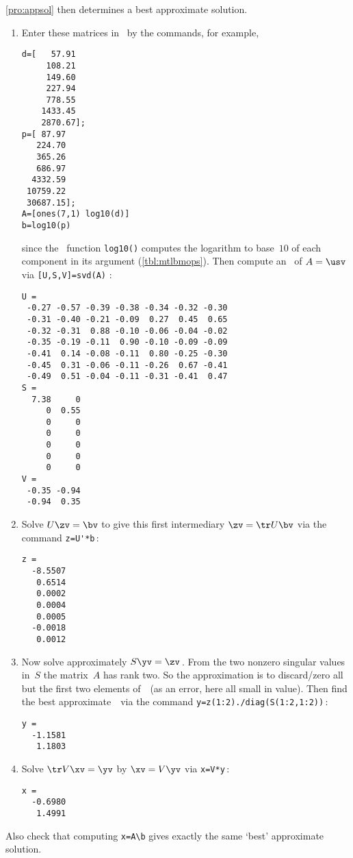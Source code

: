 \begin{example}
\begin{solution}
\autoref{pro:appsol} then determines a best approximate solution.
\begin{enumerate}
\item Enter these matrices in \script\ by the commands, for example,
\setbox\ajrqrbox\hbox{}%
\marginajrbox%
\begin{verbatim}
d=[   57.91
     108.21
     149.60
     227.94
     778.55
    1433.45
    2870.67];
p=[ 87.97
   224.70
   365.26
   686.97
  4332.59
 10759.22
 30687.15];
A=[ones(7,1) log10(d)]
b=log10(p)
\end{verbatim}
since the \script\ function \verb|log10()| computes the logarithm to base~\(10\) of each component in its argument (\autoref{tbl:mtlbmops}).
Then compute an \svd\ of \(A=\usv\) via \verb|[U,S,V]=svd(A)| \twodp:
\begin{verbatim}
U =
 -0.27 -0.57 -0.39 -0.38 -0.34 -0.32 -0.30
 -0.31 -0.40 -0.21 -0.09  0.27  0.45  0.65
 -0.32 -0.31  0.88 -0.10 -0.06 -0.04 -0.02
 -0.35 -0.19 -0.11  0.90 -0.10 -0.09 -0.09
 -0.41  0.14 -0.08 -0.11  0.80 -0.25 -0.30
 -0.45  0.31 -0.06 -0.11 -0.26  0.67 -0.41
 -0.49  0.51 -0.04 -0.11 -0.31 -0.41  0.47
S =
  7.38     0
     0  0.55
     0     0
     0     0
     0     0
     0     0
     0     0
V =
 -0.35 -0.94
 -0.94  0.35
\end{verbatim}
\item Solve \(U\zv=\bv\) to give this first intermediary \(\zv=\tr U\bv\) via the command \verb|z=U'*b|\,:
\begin{verbatim}
z =
  -8.5507
   0.6514
   0.0002
   0.0004
   0.0005
  -0.0018
   0.0012
\end{verbatim}

\item Now solve approximately \(S\yv=\zv\)\,. 
From the two nonzero singular values in~\(S\) the matrix~\(A\) has rank two.
So the approximation is to discard\slash zero all but the first two elements of~\zv\ (as an error, here all small in value).
Then find the best approximate~\yv\ via the command \verb|y=z(1:2)./diag(S(1:2,1:2))|\,:
\begin{verbatim}
y =
  -1.1581
   1.1803
\end{verbatim}

\item Solve \(\tr V\xv=\yv\) by \(\xv=V\yv\) via \verb|x=V*y|\,:
\begin{verbatim}
x =
  -0.6980
   1.4991
\end{verbatim}
\end{enumerate}
Also check that computing \verb|x=A\b| gives exactly the same `best' approximate solution. 


\end{solution}
\end{example}
